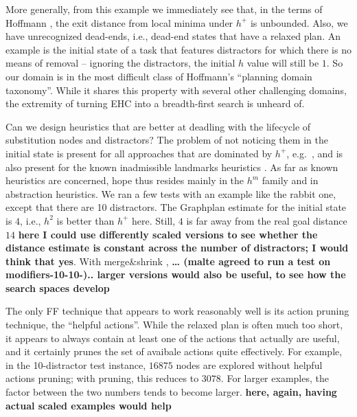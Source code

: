 More generally, from this example we immediately see that, in the
terms of Hoffmann , the exit distance from
local minima under $h^+$ is unbounded. Also, we have unrecognized
dead-ends, i.e., dead-end states that have a relaxed plan. An example
is the initial state of a task that features distractors for which
there is no means of removal -- ignoring the distractors, the initial
$h$ value will still be $1$. So our domain is in the most difficult
class of Hoffmann's  ``planning domain
taxonomy''. While it shares this property with several other
challenging domains, the extremity of turning EHC into a breadth-first
search is unheard of.


Can we design heuristics that are better at deadling with the
lifecycle of substitution nodes and distractors? The problem of not
noticing them in the initial state is present for all approaches that
are dominated by $h^+$,
e.g.\ \cite{karpas:domshlak-ijcai-09,helmert:domshlak:icaps-09}, and
is also present for the known inadmissible landmarks heuristics
\cite{richter:etal:aaai-08}. As far as known heuristics are concerned,
hope thus resides mainly in the $h^m$ family and in abstraction
heuristics. We ran a few tests with an example like the rabbit one,
except that there are 10 distractors. The Graphplan estimate for the
initial state is $4$, i.e., $h^2$ is better than $h^+$ here. Still,
$4$ is far away from the real goal distance $14$ {\bf here I could use
  differently scaled versions to see whether the distance estimate is
  constant across the number of distractors; I would think that
  yes}. With merge\&shrink \cite{helmert:etal:icaps07}, {\bf \dots
  (malte agreed to run a test on modifiers-10-10-).. larger versions
  would also be useful, to see how the search spaces develop}






The only FF technique that appears to work reasonably well is its
action pruning technique, the ``helpful actions''. While the relaxed
plan is often much too short, it appears to always contain at least
one of the actions that actually are useful, and it certainly prunes
the set of avaibale actions quite effectively. For example, in the
10-distractor test instance, $16875$ nodes are explored without
helpful actions pruning; with pruning, this reduces to $3078$. For
larger examples, the factor between the two numbers tends to become
larger. {\bf here, again, having actual scaled examples would help}



